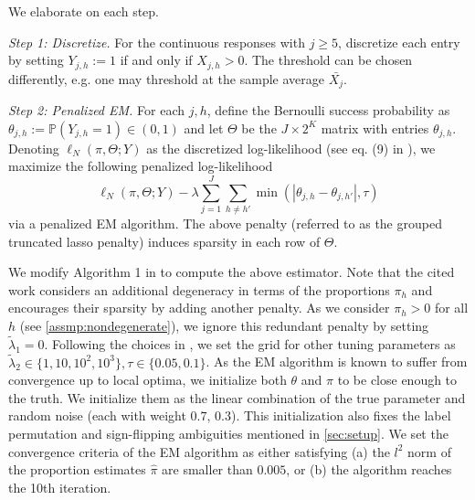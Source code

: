 \documentclass[10pt]{article} %
\newcommand{\PP}{\mathbb P}
\def\hat{\widehat}
\def\tilde{\widetilde}
\begin{document}
We elaborate on each step.

\emph{Step 1: Discretize.} For the continuous responses with $j \ge 5$, discretize each entry by setting $Y_{j,h} := 1$ if and only if $X_{j,h} > 0$. The threshold can be chosen differently, e.g. one may threshold at the sample average $\bar{X_j}$. 

\emph{Step 2: Penalized EM.} %
For each $j,h$, define the Bernoulli success probability as $\theta_{j,h} := \PP(Y_{j,h} = 1) \in (0,1)$ and let $\Theta$ be the $J \times 2^K$ matrix with entries $\theta_{j,h}$. Denoting $\ell_N(\pi, \Theta; Y)$ as the discretized log-likelihood (see eq. (9) in \cite{ma2023learning}), we maximize the following penalized log-likelihood
$$\ell_N(\pi, \Theta; Y) - \lambda \sum_{j=1}^J \sum_{h \neq h'} \min(|\theta_{j,h}-\theta_{j,h'}|, \tau)$$
via a penalized EM algorithm. The above penalty (referred to as the grouped truncated lasso penalty) induces sparsity in each row of $\Theta$.

We modify Algorithm 1 in \cite{ma2023learning} to compute the above estimator. Note that the cited work considers an additional degeneracy in terms of the proportions $\pi_h$ and encourages their sparsity by adding another penalty. As we consider $\pi_h > 0$ for all $h$ (see \cref{assmp:nondegenerate}), we ignore this redundant penalty by setting $\tilde{\lambda}_1 = 0$. Following the choices in \citep[pg. 196,][]{ma2023learning}, we set the grid for other tuning parameters as $\tilde{\lambda}_2 \in \{1, 10, 10^2, 10^3\}, \tau \in \{0.05, 0.1\}$. As the EM algorithm is known to suffer from convergence up to local optima, we initialize both $\theta$ and $\pi$ to be close enough to the truth. We initialize them as the linear combination of the true parameter and random noise (each with weight $0.7$, $0.3$). This initialization also fixes the label permutation and sign-flipping ambiguities mentioned in \cref{sec:setup}. We set the convergence criteria of the EM algorithm as either satisfying (a) the $l^2$ norm of the proportion estimates $\hat{\pi}$ are smaller than $0.005$, or (b) the algorithm reaches the 10th iteration.
\end{document}
